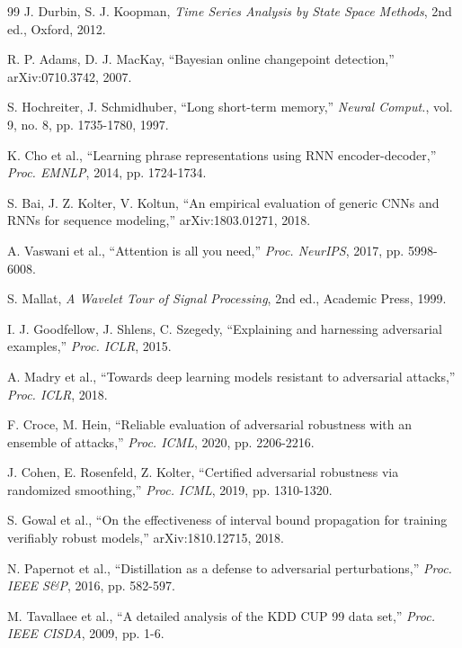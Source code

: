 \documentclass[review,12pt]{elsarticle}
\begin{document}
\begin{thebibliography}{99}
J. Durbin, S. J. Koopman, \textit{Time Series Analysis by State Space Methods}, 2nd ed., Oxford, 2012.

R. P. Adams, D. J. MacKay, ``Bayesian online changepoint detection,'' arXiv:0710.3742, 2007.

S. Hochreiter, J. Schmidhuber, ``Long short-term memory,'' \textit{Neural Comput.}, vol. 9, no. 8, pp. 1735-1780, 1997.

K. Cho et al., ``Learning phrase representations using RNN encoder-decoder,'' \textit{Proc. EMNLP}, 2014, pp. 1724-1734.

S. Bai, J. Z. Kolter, V. Koltun, ``An empirical evaluation of generic CNNs and RNNs for sequence modeling,'' arXiv:1803.01271, 2018.

A. Vaswani et al., ``Attention is all you need,'' \textit{Proc. NeurIPS}, 2017, pp. 5998-6008.

S. Mallat, \textit{A Wavelet Tour of Signal Processing}, 2nd ed., Academic Press, 1999.

I. J. Goodfellow, J. Shlens, C. Szegedy, ``Explaining and harnessing adversarial examples,'' \textit{Proc. ICLR}, 2015.

A. Madry et al., ``Towards deep learning models resistant to adversarial attacks,'' \textit{Proc. ICLR}, 2018.

F. Croce, M. Hein, ``Reliable evaluation of adversarial robustness with an ensemble of attacks,'' \textit{Proc. ICML}, 2020, pp. 2206-2216.

J. Cohen, E. Rosenfeld, Z. Kolter, ``Certified adversarial robustness via randomized smoothing,'' \textit{Proc. ICML}, 2019, pp. 1310-1320.

S. Gowal et al., ``On the effectiveness of interval bound propagation for training verifiably robust models,'' arXiv:1810.12715, 2018.

N. Papernot et al., ``Distillation as a defense to adversarial perturbations,'' \textit{Proc. IEEE S\&P}, 2016, pp. 582-597.

M. Tavallaee et al., ``A detailed analysis of the KDD CUP 99 data set,'' \textit{Proc. IEEE CISDA}, 2009, pp. 1-6.


\end{thebibliography}
\end{document}
